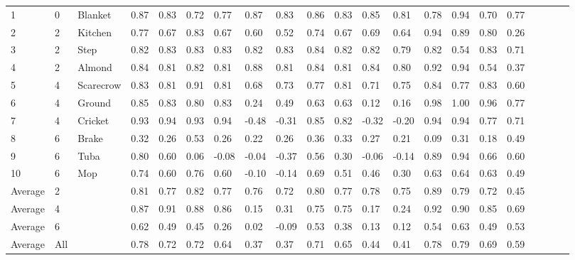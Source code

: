 \documentclass[11pt,letterpaper]{article}
\begin{document}
\begin{table}[!ht]
\begin{center}
{\begin{tabular}{lllll|ll|ll|ll|ll|ll|ll|ll|ll}
1 & 0 & Blanket   & 0.87 & 0.83  & 0.72 & 0.77 &  0.87 & 0.83 & 0.86 & 0.83 & 0.85 & 0.81 & 0.78 & 0.94 & 0.70 & 0.77\\
2 & 2 & Kitchen   & 0.77 & 0.67  & 0.83 & 0.67 &  0.60 & 0.52 & 0.74 & 0.67 & 0.69 & 0.64 & 0.94 & 0.89 & 0.80 & 0.26\\
3 & 2 & Step      & 0.82 & 0.83  & 0.83 & 0.83 &  0.82 & 0.83 & 0.84 & 0.82 & 0.82 & 0.79 & 0.82 & 0.54 & 0.83 & 0.71\\
4 & 2 & Almond    & 0.84 & 0.81  & 0.82 & 0.81 &  0.88 & 0.81 & 0.84 & 0.81 & 0.84 & 0.80 & 0.92 & 0.94 & 0.54 & 0.37\\
5 & 4 & Scarecrow & 0.83 & 0.81  & 0.91 & 0.81 &  0.68 & 0.73 & 0.77 & 0.81 & 0.71 & 0.75 & 0.84 & 0.77 & 0.83 & 0.60\\
6 & 4 & Ground    & 0.85 & 0.83  & 0.80 & 0.83 &  0.24 & 0.49 & 0.63 & 0.63 & 0.12 & 0.16 & 0.98 & 1.00 & 0.96 & 0.77\\
7 & 4 & Cricket   & 0.93 & 0.94  & 0.93 & 0.94 & -0.48 &-0.31 & 0.85 & 0.82 &-0.32 &-0.20 & 0.94 & 0.94 & 0.77 & 0.71\\
8  & 6 & Brake    & 0.32 & 0.26  & 0.53 & 0.26 &  0.22 & 0.26 & 0.36 & 0.33 & 0.27 & 0.21 & 0.09 & 0.31 & 0.18 & 0.49\\
9  & 6 & Tuba     & 0.80 & 0.60  & 0.06 &-0.08 & -0.04 &-0.37 & 0.56 & 0.30 &-0.06 &-0.14 & 0.89 & 0.94 & 0.66 & 0.60\\
10 & 6 & Mop      & 0.74 & 0.60  & 0.76 & 0.60 & -0.10 &-0.14 & 0.69 & 0.51 & 0.46 & 0.30 & 0.63 & 0.64 & 0.63 & 0.49\\

\hline
Average & 2   &       & 0.81 & 0.77  & 0.82 & 0.77 & 0.76 & 0.72 & 0.80 & 0.77 & 0.78 & 0.75 & 0.89 & 0.79 & 0.72 & 0.45\\
Average & 4   &       & 0.87 & 0.91  & 0.88 & 0.86 & 0.15 & 0.31 & 0.75 & 0.75 & 0.17 & 0.24 & 0.92 & 0.90 & 0.85 & 0.69\\
Average & 6   &       & 0.62 & 0.49  & 0.45 & 0.26 & 0.02 &-0.09 & 0.53 & 0.38 & 0.13 & 0.12 & 0.54 & 0.63 & 0.49 & 0.53\\
Average & All &       & 0.78 & 0.72  & 0.72 & 0.64 & 0.37 & 0.37 & 0.71 & 0.65 & 0.44 & 0.41 & 0.78 & 0.79 & 0.69 & 0.59\\

\hline
\end{tabular}}
\end{center}
\end{table}
\end{document}
